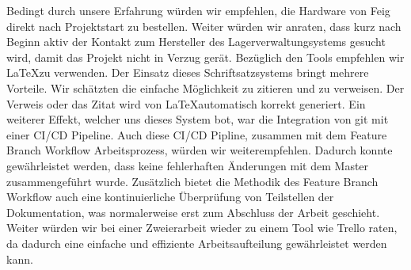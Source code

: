 Bedingt durch unsere Erfahrung würden wir empfehlen, die Hardware von Feig direkt nach Projektstart zu bestellen. Weiter würden wir anraten, dass kurz nach Beginn aktiv der Kontakt zum Hersteller des Lagerverwaltungsystems gesucht wird, damit das Projekt nicht in Verzug gerät. Bezüglich den Tools empfehlen wir \LaTeX zu verwenden. Der Einsatz dieses Schriftsatzsystems bringt mehrere Vorteile. Wir schätzten die einfache Möglichkeit zu zitieren und zu verweisen. Der Verweis oder das Zitat wird von \LaTeX automatisch korrekt generiert. Ein weiterer Effekt, welcher uns dieses System bot, war die Integration von git mit einer CI/CD Pipeline. Auch diese CI/CD Pipline, zusammen mit dem Feature Branch Workflow Arbeitsprozess, würden wir weiterempfehlen. Dadurch konnte gewährleistet werden, dass keine fehlerhaften Änderungen mit dem Master zusammengeführt wurde. Zusätzlich bietet die Methodik des Feature Branch Workflow auch eine kontinuierliche Überprüfung von Teilstellen der Dokumentation, was normalerweise erst zum Abschluss der Arbeit geschieht. Weiter würden wir bei einer Zweierarbeit wieder zu einem Tool wie Trello raten, da dadurch eine einfache und effiziente Arbeitsaufteilung gewährleistet werden kann.